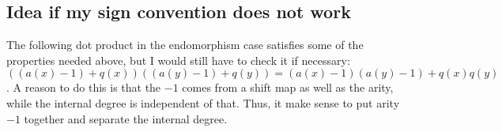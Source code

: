 \documentclass[twoside]{article}
\begin{document}
\subsection{Idea if my sign convention does not work}

The following dot product in the endomorphism case satisfies some of the properties needed above, but I would still have to check it if necessary: $((a(x)-1)+q(x))((a(y)-1)+q(y))=(a(x)-1)(a(y)-1)+q(x)q(y)$. A reason to do this is that the $-1$ comes from a shift map as well as the arity, while the internal degree is independent of that. Thus, it make sense to put arity $-1$ together and separate the internal degree.

%
%
%
%
%
\end{document}
